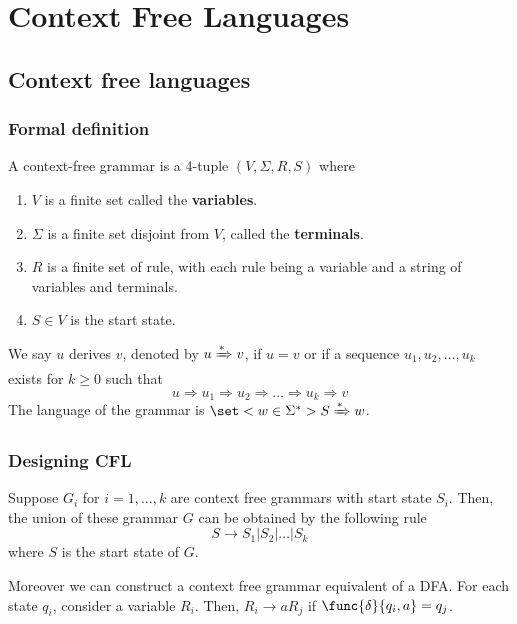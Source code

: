 \chapter{Context Free Languages}
\section{Context free languages}
\subsection{Formal definition}
\begin{definition}
    A context-free grammar is a 4-tuple \((V,\Sigma,R,S)\) where 
    \begin{enumerate}
        \item \(V\) is a finite set called the \textbf{variables}.
        \item \(\Sigma\) is a finite set disjoint from \(V\), called the \textbf{terminals}.
        \item \(R\) is a finite set of rule, with each rule being a variable and a string of variables and terminals.
        \item \(S \in V\) is the start state. 
    \end{enumerate}
\end{definition}

We say \(u\) derives \(v\), denoted by \(u \xRightarrow{\ast} v\), if \(u = v\) or if a sequence \(u_1,u_2, \dots, u_k\) exists for \(k\geq 0\) such that 
\begin{equation*}
    u \Rightarrow u_1 \Rightarrow u_2 \Rightarrow \dots \Rightarrow u_k \Rightarrow v
\end{equation*}
The language of the grammar is \(\set<w \in \Sigma^{\ast}>{S \xRightarrow{\ast} w }\).
\subsection{Designing CFL}
Suppose \(G_i\) for \(i=1,\dots,k\) are context free grammars with start state \(S_i\). Then, the union of these grammar \(G\) can be obtained by the following rule 
\begin{equation*}
    S \rightarrow S_1 | S_2 | \dots | S_k
\end{equation*}
where \(S\) is the start state of \(G\).

Moreover we can construct a context free grammar equivalent of a DFA. For each state \(q_i\), consider a variable \(R_i\). Then, \(R_i \rightarrow aR_j\) if \(\func{\delta}{q_i,a} = q_j\).

